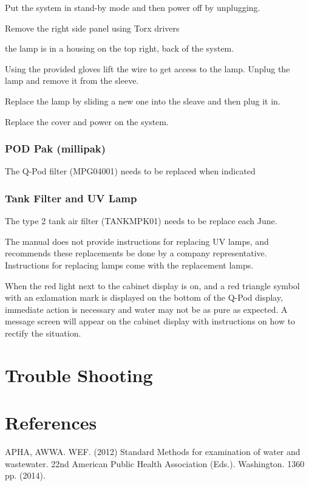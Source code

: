 \documentclass[12pt]{../SOP3_beta}\usepackage[]{graphicx}\usepackage[]{xcolor}
\begin{document}
\NP Put the system in stand-by mode and then power off by unplugging.

\NP Remove the right side panel using Torx drivers

\NP the lamp is in a housing on the top right, back of the system. 

\NP Using the provided gloves lift the wire to get access to the lamp. Unplug the lamp and remove it from the sleeve. 

\NP Replace the lamp by sliding a new one into the sleave and then plug it in. 

\NP Replace the cover and power on the system. 

\subsubsection{POD Pak (millipak)}

\NP The Q-Pod filter (MPG04001) needs to be replaced when indicated

\subsubsection{Tank Filter and UV Lamp}

\NP The type 2 tank air filter (TANKMPK01) needs to be replace each June. 

\NP The manual does not provide instructions for replacing UV lamps, and recommends these replacements be done by a company representative. Instructions for replacing lamps come with the replacement lamps.

\NP When the red light next to the cabinet display is on, and a red triangle symbol with an exlamation mark is displayed on the bottom of the Q-Pod display, immediate action is necessary and water may not be as pure as expected. A message screen will appear on the cabinet display with instructions on how to rectify the situation. 

\section{Trouble Shooting}

\section{References}

\NP APHA, AWWA. WEF. (2012) Standard Methods for examination of water and wastewater. 22nd American Public Health Association (Eds.). Washington. 1360 pp. (2014).
\end{document}
